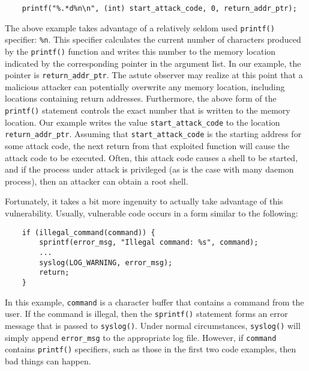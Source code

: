 \documentclass[]{article}
\begin{document}
\begin{verbatim}
    printf("%.*d%n\n", (int) start_attack_code, 0, return_addr_ptr);
\end{verbatim}

The above example takes advantage of a relatively seldom used {\tt printf()}
specifier:  {\tt \%n}.  This specifier calculates the current number of
characters produced by the {\tt printf()} function and writes this number to
the memory location indicated by the corresponding pointer in the argument
list.  In our example, the pointer is {\tt return\_addr\_ptr}.  The astute
observer may realize at this point that a malicious attacker can potentially
overwrite any memory location, including locations containing return addresses.
Furthermore, the above form of the {\tt printf()} statement controls the exact
number that is written to the memory location.  Our example writes the value
{\tt start\_attack\_code} to the location {\tt return\_addr\_ptr}.  Assuming
that {\tt start\_attack\_code} is the starting address for some attack code,
the next return from that exploited function will cause the attack code to be
executed.  Often, this attack code causes a shell to be started, and if the
process under attack is privileged (as is the case with many daemon process),
then an attacker can obtain a root shell.

Fortunately, it takes a bit more ingenuity to actually take advantage of this
vulnerability.  Usually, vulnerable code occurs in a form similar to the
following:

\begin{verbatim}
    if (illegal_command(command)) {
        sprintf(error_msg, "Illegal command: %s", command);
        ...
        syslog(LOG_WARNING, error_msg);
        return;
    }
\end{verbatim}

In this example, {\tt command} is a character buffer that contains a command
from the user.  If the command is illegal, then the {\tt sprintf()} statement
forms an error message that is passed to {\tt syslog()}.  Under normal
circumstances, {\tt syslog()} will simply append {\tt error\_msg} to the
appropriate log file.  However, if {\tt command} contains {\tt printf()}
specifiers, such as those in the first two code examples, then bad things can
happen.
\end{document}
